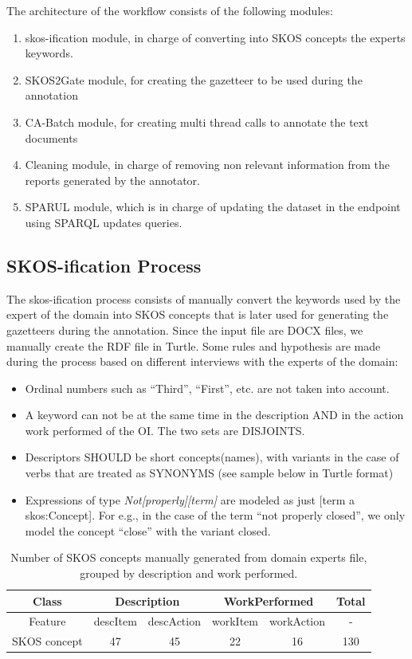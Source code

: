 \documentclass[runningheads,a4paper]{{llncs}}
\newcommand{\myitem}{\item[\checkmark]}
\begin{document}
The architecture of the workflow consists of the following modules:
\begin{enumerate}
\item skos-ification module, in charge of converting into SKOS concepts the experts keywords.
\item SKOS2Gate module, for creating the gazetteer to be used during the annotation
\item CA-Batch module, for creating multi thread calls to annotate the text documents
\item Cleaning module, in charge of removing non relevant information from the reports generated by the annotator.
\item SPARUL module, which is in charge of updating the dataset in the endpoint using SPARQL updates queries.  
\end{enumerate}
 

\subsection{SKOS-ification Process}
\label{sec:skosification}

The skos-ification process consists of manually convert the keywords used by the expert of the domain into SKOS concepts that is later used for generating the gazetteers during the annotation. Since the input file are DOCX files, we manually create the RDF file in Turtle. Some rules and hypothesis are made during the process based on different interviews with the experts of the domain:

\begin{itemize}
\myitem Ordinal numbers such as ``Third'', ``First'', etc. are not taken into account. 
\myitem A keyword can not be at the same time in the description AND in the action work performed of the OI. The two sets are DISJOINTS.
\myitem Descriptors SHOULD be short concepts(names), with variants in the case of verbs that are treated as SYNONYMS (see sample below in Turtle format)
\myitem Expressions of type \textit{Not[properly][term]} are modeled as just [term a skos:Concept].
For e.g.,  in the case of the term ``not properly closed'', we only model the concept ``close'' with the variant closed. 
\end{itemize}


\begin{table}[h!tb]
\caption{Number of SKOS concepts manually generated from domain experts file, grouped by description and work performed.}
\label{tabskos}
\centering
\begin{tabular}{|c|c|c|c|c|c|}
\hline 
Class & \multicolumn{2}{c|}{Description} & \multicolumn{2}{c|}{WorkPerformed} & Total  \\ 
\hline 
Feature & descItem & descAction & workItem & workAction & - \\ 
\hline 
SKOS concept & 47 & 45 & 22 & 16 & 130 \\ 
\hline 

\end{tabular} 

\end{table}
\end{document}
